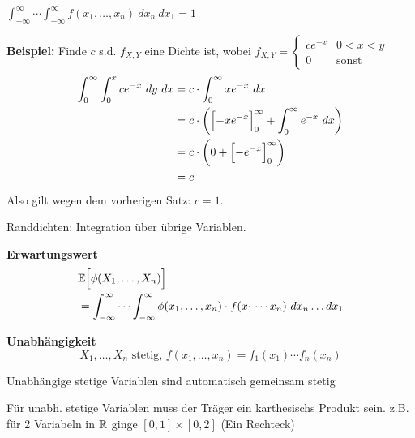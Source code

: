\newpage

\theorem $\displaystyle\int_{-\infty}^\infty\cdots\int_{-\infty}^\infty f(x_1,\ldots,x_n)\ dx_n\ dx_1 = 1$\\

{\scriptsize
    \textbf{Beispiel:} Finde $c$ s.d. $f_{X,Y}$ eine Dichte ist, wobei
    $
        f_{X,Y}=\begin{cases}
            ce^{-x}     & 0 < x < y \\
            0           & \text{sonst}
        \end{cases}
    $
    \begin{align*}
        \int_0^\infty \int_0^x ce^{-x}\ dy\ dx  &= c\cdot \int_0^\infty xe^{-x}\ dx                                                     \\ 
                                                &= c\cdot\biggl( \Bigl[ -xe^{-x} \Bigr]_0^\infty + \int_0^\infty e^{-x}\ dx \biggr)     \\
                                                &= c\cdot\biggl( 0 + \Bigl[ -e^{-x} \Bigr]_0^\infty \biggr)                             \\
                                                &= c
    \end{align*}
    Also gilt wegen dem vorherigen Satz: $c=1$.
}

{\footnotesize
    \remark Randdichten: Integration über übrige Variablen.
}


\theorem \textbf{Erwartungswert}\\
\begin{align*}
    &\mathbb{E}\Bigl[ \phi(X_1,\ldots,X_n) \Bigr] \\
    &= \int_{-\infty}^\infty\cdots\int_{-\infty}^\infty\phi(x_1,\ldots,x_n)\cdot f(x_1\cdots x_n)\ dx_n\ldots dx_1    
\end{align*}


\theorem \textbf{Unabhängigkeit}
$$
    X_1,\ldots,X_n \text{ stetig, } f(x_1,\ldots,x_n) = f_1(x_1)\cdots f_n(x_n)
$$

{\scriptsize
    \remark Unabhängige stetige Variablen sind automatisch gemeinsam stetig

    \remark Für unabh. stetige Variablen muss der Träger ein karthesischs Produkt sein. z.B. für 2 Variabeln in $\mathbb{R}$ ginge $[0,1]\times[0,2]$ (Ein Rechteck) 
}


